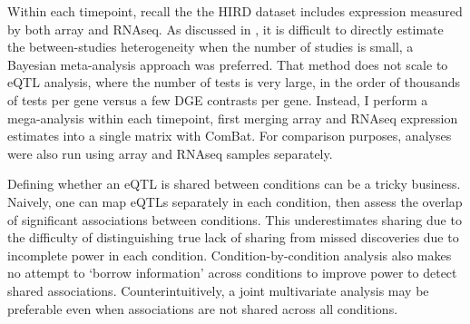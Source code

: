 %
%
%
%
Within each timepoint, recall the the \gls{HIRD} dataset includes expression measured by both array and \gls{RNAseq}.
As discussed in , it is difficult to directly estimate the between-studies heterogeneity when the number of studies is small, a Bayesian meta-analysis approach was preferred.
That method does not scale to \gls{eQTL} analysis, where the number of tests is very large, in the order of thousands of tests per gene versus a few \gls{DGE} contrasts per gene.
Instead, I perform a mega-analysis within each timepoint, first merging array and \gls{RNAseq} expression estimates into a single matrix with ComBat.
For comparison purposes, analyses were also run using array and \gls{RNAseq} samples separately.

Defining whether an \gls{eQTL} is shared between conditions can be a tricky business.
Naively, one can map \glspl{eQTL} separately in each condition, then assess the overlap of significant associations between conditions.
This underestimates sharing due to the difficulty of distinguishing true lack of sharing from missed discoveries due to incomplete power in each condition.
Condition-by-condition analysis also makes no attempt to \enquote*{borrow information} across conditions to improve power to detect shared associations\autocite{flutre2013StatisticalFrameworkJoint,urbut2018FlexibleStatisticalMethods,li2018HTeQTLIntegrativeExpression}.
Counterintuitively, a joint multivariate analysis may be preferable even when associations are not shared across all conditions\autocite{stephens2013UnifiedFrameworkAssociation}.

